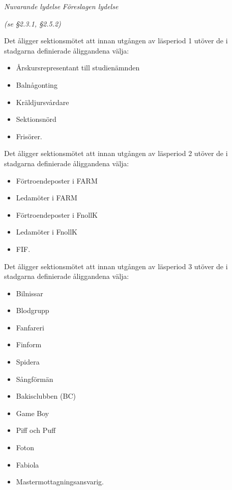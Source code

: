 \documentclass{article}
\newenvironment{lydelse}
    {\begin{paracol}{2}%
        \emph{Nuvarande lydelse}%
        \switchcolumn%
        \emph{Föreslagen lydelse}%
    \end{paracol}%
    \begin{enumerate}[label=\thesubsection.\arabic*]%
    \begin{paracol}{2}%
    }{\end{paracol}\end{enumerate}}
\begin{document}
\begin{lydelse}
    \item[] \emph{(se \S 2.3.1, \S 2.5.2)}
    \setcounter{subsection}{4}
    
    \item[]
    \item[]
    \vspace{12em}
    \item Det åligger sektionsmötet att innan utgången av läsperiod 1 utöver de i stadgarna definierade åliggandena välja:
    \begin{itemize}
			\item Årskursrepresentant till studienämnden
			\item Balnågonting
			\item Kräldjursvårdare  %
			\item Sektionsnörd      %
		\item Frisörer.         %
	\end{itemize}
    
    \item Det åligger sektionsmötet att innan utgången av läsperiod 2 utöver de i stadgarna definierade åliggandena välja:
	\begin{itemize}
		\item Förtroendeposter i FARM
		\item Ledamöter i FARM
		\item Förtroendeposter i FnollK
		\item Ledamöter i FnollK
		\item FIF.
    \end{itemize}

	\item Det åligger sektionsmötet att innan utgången av läsperiod 3 utöver de i stadgarna definierade åliggandena välja:
	\begin{itemize}
		\item Bilnissar
		\item Blodgrupp
		\item Fanfareri
		\item Finform
		\item Spidera
		\item Sångförmän
		\item Bakisclubben (BC)
		\item Game Boy
		\item Piff och Puff
		\item Foton
		\item Fabiola
		\item Mastermottagningsansvarig.
	\end{itemize}


\end{lydelse}
\end{document}
